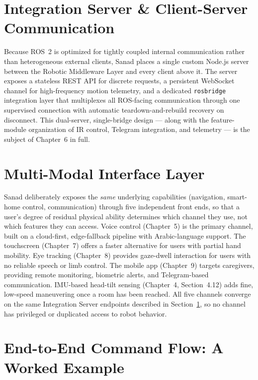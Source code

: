 \section{Integration Server \& Client-Server Communication}
\label{sec:arch_server}

Because ROS~2 is optimized for tightly coupled internal communication rather than heterogeneous external clients, Sanad places a single custom Node.js server between the Robotic Middleware Layer and every client above it. The server exposes a stateless REST API for discrete requests, a persistent WebSocket channel for high-frequency motion telemetry, and a dedicated \texttt{rosbridge} integration layer that multiplexes all ROS-facing communication through one supervised connection with automatic teardown-and-rebuild recovery on disconnect. This dual-server, single-bridge design --- along with the feature-module organization of IR control, Telegram integration, and telemetry --- is the subject of Chapter~6 in full.

\section{Multi-Modal Interface Layer}
\label{sec:arch_interfaces}

Sanad deliberately exposes the \emph{same} underlying capabilities (navigation, smart-home control, communication) through five independent front ends, so that a user's degree of residual physical ability determines which channel they use, not which features they can access. Voice control (Chapter~5) is the primary channel, built on a cloud-first, edge-fallback pipeline with Arabic-language support. The touchscreen (Chapter~7) offers a faster alternative for users with partial hand mobility. Eye tracking (Chapter~8) provides gaze-dwell interaction for users with no reliable speech or limb control. The mobile app (Chapter~9) targets caregivers, providing remote monitoring, biometric alerts, and Telegram-based communication. IMU-based head-tilt sensing (Chapter~4, Section~4.12) adds fine, low-speed maneuvering once a room has been reached. All five channels converge on the same Integration Server endpoints described in Section~\ref{sec:arch_server}, so no channel has privileged or duplicated access to robot behavior.

\section{End-to-End Command Flow: A Worked Example}
\label{sec:arch_e2e}

